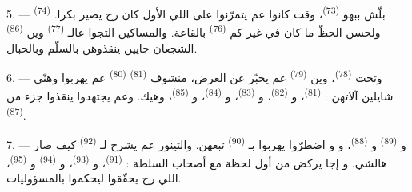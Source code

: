 5. ---  \textsuperscript{(74)} بلّش ببهو 
\textsuperscript{(73)}، وقت كانوا عم يتمرّنوا على  اللي
 الأول كان رح يصير بكرا. ولحسن الحظّ ما كان في غير كم
 \textsuperscript{(76)} بالقاعة. والمساكين التجوا
عالـ \textsuperscript{(77)} وين 
\textsuperscript{(86)} الشجعان جايين ينقذوهن بالسلّم وبالحبال.

6. --- وتحت  \textsuperscript{(78)}، وين
 \textsuperscript{(79)} عم يخبّر عن العرض، منشوف
 \textsuperscript{(81)} 
\textsuperscript{(80)} عم يهربوا وهنّي شايلين آلاتهن :
 \textsuperscript{(81)}، و \textsuperscript{(82)}،
و \textsuperscript{(83)}، و
\textsuperscript{(84)}، و \textsuperscript{(85)}، وهيك. وعم
يجتهدوا ينقذوا جزء من  \textsuperscript{(87)}.

7. --- و \textsuperscript{(89)}
و \textsuperscript{(88)}، و
و اضطرّوا يهربوا بـ
\textsuperscript{(90)} تبعهن. والتينور عم يشرح لـ
\textsuperscript{(92)} كيف صار هالشي. و إجا يركض من أول
لحظة مع أصحاب السلطة :  \textsuperscript{(91)}،
و \textsuperscript{(93)}، و
\textsuperscript{(94)} و \textsuperscript{(95)}،
اللي رح يحقّقوا ليحكموا بالمسؤوليات.

\VUsaut{6.0mm}
\VUfilet{22mm}
